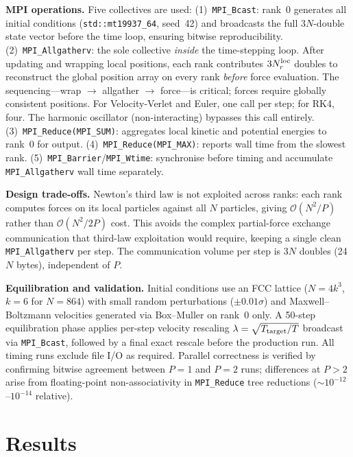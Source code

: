 \documentclass[10pt,twocolumn]{article}
\begin{document}
\textbf{MPI operations.}
Five collectives are used:
(1)~\texttt{MPI\_Bcast}: rank~0 generates all initial conditions
    (\texttt{std::mt19937\_64}, seed~42) and broadcasts the full $3N$-double
    state vector before the time loop, ensuring bitwise reproducibility.
(2)~\texttt{MPI\_Allgatherv}: the sole collective \emph{inside} the
    time-stepping loop. After updating and wrapping local positions, each
    rank contributes $3N_r^{\rm loc}$ doubles to reconstruct the global
    position array on every rank \emph{before} force evaluation.
    The sequencing---wrap $\to$ allgather $\to$ force---is critical;
    forces require globally consistent positions.
    For Velocity-Verlet and Euler, one call per step; for RK4, four.
    The harmonic oscillator (non-interacting) bypasses this call entirely.
(3)~\texttt{MPI\_Reduce(MPI\_SUM)}: aggregates local kinetic and potential
    energies to rank~0 for output.
(4)~\texttt{MPI\_Reduce(MPI\_MAX)}: reports wall time from the slowest rank.
(5)~\texttt{MPI\_Barrier}/\texttt{MPI\_Wtime}: synchronise before timing
    and accumulate \texttt{MPI\_Allgatherv} wall time separately.

\textbf{Design trade-offs.}
Newton's third law is not exploited across ranks: each rank computes forces
on its local particles against all $N$ particles, giving
$\mathcal{O}(N^2/P)$ rather than $\mathcal{O}(N^2/2P)$ cost.
This avoids the complex partial-force exchange communication that third-law
exploitation would require, keeping a single clean \texttt{MPI\_Allgatherv}
per step.
The communication volume per step is $3N$ doubles (24$N$ bytes), independent
of $P$.

\textbf{Equilibration and validation.}
Initial conditions use an FCC lattice ($N=4k^3$, $k=6$ for $N=864$)
with small random perturbations ($\pm0.01\sigma$) and Maxwell--Boltzmann
velocities generated via Box--Muller on rank~0 only.
A 50-step equilibration phase applies per-step velocity rescaling
$\lambda = \sqrt{T_{\rm target}/T}$ broadcast via \texttt{MPI\_Bcast},
followed by a final exact rescale before the production run.
All timing runs exclude file I/O as required.
Parallel correctness is verified by confirming bitwise agreement between
$P=1$ and $P=2$ runs; differences at $P>2$ arise from floating-point
non-associativity in \texttt{MPI\_Reduce} tree reductions
(${\sim}10^{-12}$--$10^{-14}$ relative).

\section{Results}
\label{sec:results}
\end{document}
